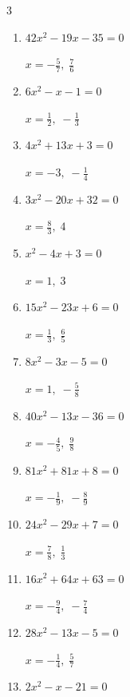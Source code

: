 \begin{multicols}{3}
\begin{enumerate}
        $\displaystyle x=\frac{5}{6},\; \frac{1}{4}$

  \item $42x^{2}-19x-35=0$

        $\displaystyle x=-\frac{5}{7},\; \frac{7}{6}$

  \item $6x^{2}-x-1=0$

        $\displaystyle x=\frac{1}{2},\; -\frac{1}{3}$

  \item $4x^{2}+13x+3=0$

        $\displaystyle x=-3,\; -\frac{1}{4}$

  \item $3x^{2}-20x+32=0$

        $\displaystyle x=\frac{8}{3},\; 4$

  \item $x^{2}-4x+3=0$

        $\displaystyle x=1,\; 3$

\columnbreak %

  \item $15x^{2}-23x+6=0$

        $\displaystyle x=\frac{1}{3},\; \frac{6}{5}$

  \item $8x^{2}-3x-5=0$

        $\displaystyle x=1,\; -\frac{5}{8}$

  \item $40x^{2}-13x-36=0$

        $\displaystyle x=-\frac{4}{5},\; \frac{9}{8}$

  \item $81x^{2}+81x+8=0$

        $\displaystyle x=-\frac{1}{9},\; -\frac{8}{9}$

  \item $24x^{2}-29x+7=0$

        $\displaystyle x=\frac{7}{8},\; \frac{1}{3}$

  \item $16x^{2}+64x+63=0$

        $\displaystyle x=-\frac{9}{4},\; -\frac{7}{4}$

  \item $28x^{2}-13x-5=0$

        $\displaystyle x=-\frac{1}{4},\; \frac{5}{7}$

  \item $2x^{2}-x-21=0$


\end{enumerate}
\end{multicols}
